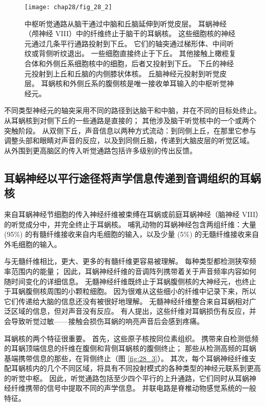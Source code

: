 \begin{figure}[htbp]
	\centering
	\texttt{[image: chap28/fig\_28\_2]}
	\caption{中枢听觉通路从脑干通过中脑和丘脑延伸到听觉皮层。 耳蜗神经（颅神经 VIII）中的纤维终止于脑干的耳蜗核。 这些细胞核的神经元通过几条平行通路投射到下丘。 它们的轴突通过梯形体、中间听纹或背侧听纹退出。 一些细胞直接终止于下丘。 其他接触上橄榄复合体和外侧丘系细胞核中的细胞，后者又投射到下丘。 下丘的神经元投射到上丘和丘脑的内侧膝状体核。 丘脑神经元投射到听觉皮层。 耳蜗核和外侧丘系的腹侧核是唯一接收单耳输入的中枢听觉神经元。}
	\label{fig:28_2}
\end{figure}

不同类型神经元的轴突采用不同的路径到达脑干和中脑，并在不同的目标处终止。 从耳蜗核到对侧下丘的一些通路是直接的； 其他涉及脑干听觉核中的一个或两个突触阶段。 从双侧下丘，声音信息以两种方式流动：到同侧上丘，在那里它参与调整头部和眼睛对声音的反应，以及到同侧丘脑，传递到大脑皮层的听觉区域。 从外围到更高脑区的传入听觉通路包括许多级别的传出反馈。

\subsection{耳蜗神经以平行途径将声学信息传递到音调组织的耳蜗核}
来自耳蜗神经节细胞的传入神经纤维被束缚在耳蜗或前庭耳蜗神经（脑神经 VIII）的听觉成分中，并完全终止于耳蜗核。 哺乳动物的耳蜗神经包含两组纤维：大量 (95\%) 的有髓纤维接收来自内毛细胞的输入，以及少量 (5\%) 的无髓纤维接收来自外毛细胞的输入。

与无髓纤维相比，更大、更多的有髓纤维更容易被理解。 每种类型都检测狭窄频率范围内的能量； 因此，耳蜗神经纤维的音调阵列携带着关于声音频率内容如何随时间变化的详细信息。 无髓神经纤维既终止于耳蜗腹侧核的大神经元，也终止于耳蜗腹侧核周围的小颗粒细胞。 因为很难从这些细小的纤维中记录下来，所以它们传递给大脑的信息还没有被很好地理解。 无髓神经纤维整合来自耳蜗相对广泛区域的信息，但对声音没有反应。 有人提出，这些纤维对耳蜗损伤有反应，并会导致听觉过敏——接触会损伤耳蜗的响亮声音后会感到疼痛。

耳蜗核的两个特征很重要。 首先，这些原子核按同位素组织。 携带来自检测低频的耳蜗顶端信息的纤维在腹侧和背侧耳蜗核的腹侧终止； 那些从检测高频的耳蜗基端携带信息的那些，在背侧终止（图 \ref{fig:28_3}）。 其次，每个耳蜗神经纤维支配耳蜗核内的几个不同区域，将具有不同投射模式的各种类型的神经元联系到更高的听觉中枢。 因此，听觉通路包括至少四个平行的上升通路，它们同时从耳蜗神经纤维携带的信号中提取不同的声学信息。 并联电路是脊椎动物感觉系统的一般特征。

